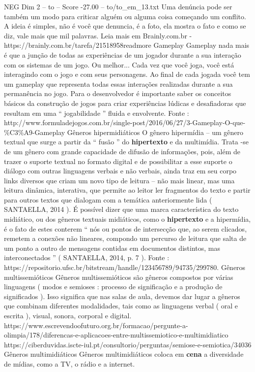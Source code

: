 \begin{textsample}{NEG Dim 2 – to – Score -27.00 – to/to\_em\_13.txt}
Uma denúncia pode ser também um modo para criticar alguém ou alguma coisa começando um conflito.
A ideia é simples, não é você que denuncia, é a foto, ela mostra o fato e como se diz, vale mais que mil palavras.
Leia mais em Brainly.com.br - https://brainly.com.br/tarefa/21518958readmore Gameplay Gameplay nada mais é que a junção de todas as experiências de um jogador durante a sua interação com os sistemas de um jogo.
Ou melhor...
Cada vez que você joga, você está interagindo com o jogo e com seus personagens.
Ao final de cada jogada você tem um gameplay que representa todas essas interações realizadas durante a sua permanência no jogo.
Para o desenvolvedor é importante saber os conceitos básicos da construção de jogos para criar experiências lúdicas e desafiadoras que resultam em uma “ jogabilidade ” fluida e envolvente.
Fonte : http://www.formuladejogos.com.br/single-post/2016/06/27/3-Gameplay-O-que-\%C3\%A9-Gameplay Gêneros hipermidiáticos O gênero hipermídia – um gênero textual que surge a partir da “ fusão ” do \textbf{hipertexto} e da multimídia.
Trata -se de um gênero com grande capacidade de difusão de informações, pois, além de trazer o suporte textual no formato digital e de possibilitar a esse suporte o diálogo com outras linguagens verbais e não verbais, ainda traz em seu corpo links diversos que criam um novo tipo de leitura – não mais linear, mas uma leitura dinâmica, interativa, que permite ao leitor ler fragmentos do texto e partir para outros textos que dialogam com a temática anteriormente lida ( SANTAELLA, 2014 ).
É possível dizer que uma marca característica do texto midiático, ou dos gêneros textuais midiáticos, como o \textbf{hipertexto} e a hipermídia, é o fato de estes conterem “ nós ou pontos de intersecção que, ao serem clicados, remetem a conexões não lineares, compondo um percurso de leitura que salta de um ponto a outro de mensagens contidas em documentos distintos, mas interconectados ” ( SANTAELLA, 2014, p. 7 ).
Fonte : https://repositorio.ufsc.br/bitstream/handle/123456789/94735/299780.
Gêneros multissemióticos Gêneros multissemióticos são gêneros compostos por várias linguagens ( modos e semioses : processo de significação e a produção de significados ).
Isso significa que nas salas de aula, devemos dar lugar a gêneros que combinam diferentes modalidades, tais como as linguagens verbal ( oral e escrita ), visual, sonora, corporal e digital. https://www.escrevendoofuturo.org.br/formacao/pergunte-a-olimpia/178/diferencas-e-aplicacoes-entre-multissemiotico-e-multimidiatico https://ciberduvidas.iscte-iul.pt/consultorio/perguntas/semiose-e-semiotica/34036 Gêneros multimidiáticos Gêneros multimidiáticos coloca em \textbf{cena} a diversidade de mídias, como a TV, o rádio e a internet.

\end{textsample}

